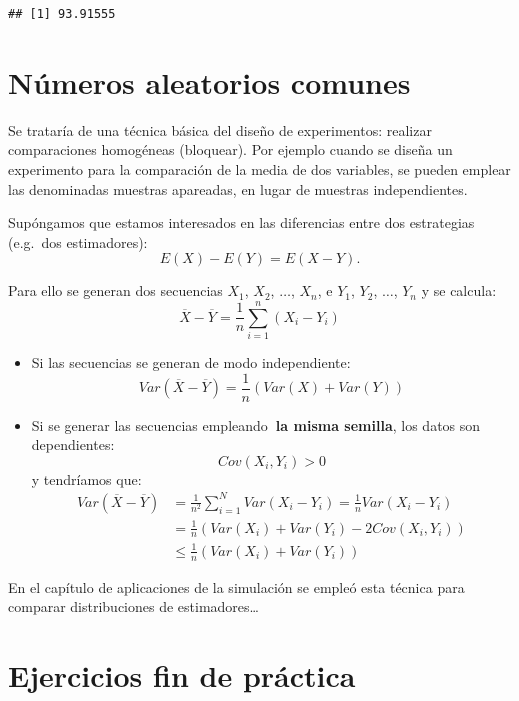 \documentclass[]{book}
\theoremstyle{definition}
\theoremstyle{definition}
\theoremstyle{definition}
\theoremstyle{remark}
\begin{document}
\begin{verbatim}
## [1] 93.91555
\end{verbatim}

\section{Números aleatorios comunes}\label{numeros-aleatorios-comunes}

Se trataría de una técnica básica del diseño de experimentos: realizar
comparaciones homogéneas (bloquear). Por ejemplo cuando se diseña un
experimento para la comparación de la media de dos variables, se pueden
emplear las denominadas muestras apareadas, en lugar de muestras
independientes.

Supóngamos que estamos interesados en las diferencias entre dos
estrategias (e.g.~dos estimadores):
\[E\left(  X\right)  -E\left(  Y\right)  =E\left(  X-Y\right).\]

Para ello se generan dos secuencias \(X_{1}\), \(X_{2}\), \(\ldots\),
\(X_{n}\), e \(Y_{1}\), \(Y_{2}\), \(\ldots\), \(Y_{n}\) y se calcula:
\[\overline{X}-\overline{Y}=\frac{1}{n}\sum_{i=1}^{n}\left(  X_{i}-Y_{i}\right)\]

\begin{itemize}
\item
  Si las secuencias se generan de modo independiente:
  \[Var\left( \overline{X} - \overline{Y} \right) 
  = \frac{1}{n} \left( Var\left( X \right) + Var\left( Y \right) \right)\]
\item
  Si se generar las secuencias empleando\textbf{~la misma semilla}, los
  datos son dependientes: \[Cov\left( X_{i}, Y_{i} \right) > 0\] y
  tendríamos que: \[\begin{aligned}
  Var\left( \overline{X}-\overline{Y}\right)  &
  = \frac{1}{n^{2}}\sum_{i=1}^{N}Var\left( X_{i}-Y_{i}\right) 
  = \frac{1}{n}Var\left( X_{i}-Y_{i}\right) \\
  & = \frac{1}{n}\left( Var\left( X_{i} \right) + Var\left( Y_{i} \right)
  - 2Cov\left( X_{i},Y_{i} \right) \right) \\
  & \leq \frac{1}{n}\left( Var\left( X_{i} \right) 
  + Var\left( Y_{i}\right) \right)
  \end{aligned}\]
\end{itemize}

En el capítulo de aplicaciones de la simulación se empleó esta técnica
para comparar distribuciones de estimadores\ldots{}

\section{Ejercicios fin de práctica}\label{ejercicios-fin-de-practica}
\end{document}
